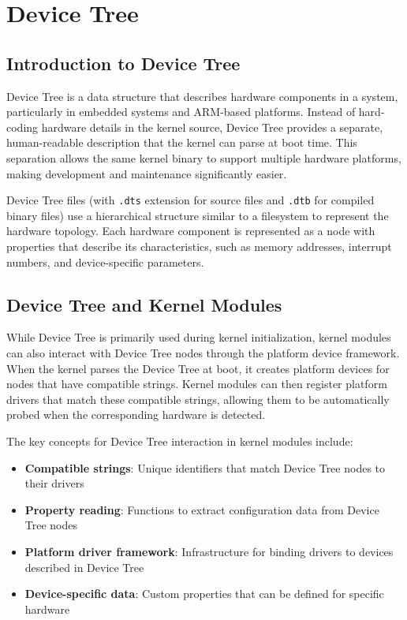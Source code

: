 \documentclass[10pt, oneside]{book}
\begin{document}

\section{Device Tree}
\label{sec:device_tree}
\subsection{Introduction to Device Tree}
\label{sec:dt_intro}
Device Tree is a data structure that describes hardware components in a system, particularly in embedded systems and ARM-based platforms.
Instead of hard-coding hardware details in the kernel source, Device Tree provides a separate, human-readable description that the kernel can parse at boot time.
This separation allows the same kernel binary to support multiple hardware platforms,
making development and maintenance significantly easier.

Device Tree files (with \verb|.dts| extension for source files and \verb|.dtb| for compiled binary files) use a hierarchical structure similar to a filesystem to represent the hardware topology.
Each hardware component is represented as a node with properties that describe its characteristics,
such as memory addresses, interrupt numbers, and device-specific parameters.

\subsection{Device Tree and Kernel Modules}
\label{sec:dt_modules}
While Device Tree is primarily used during kernel initialization, kernel modules can also interact with Device Tree nodes through the platform device framework.
When the kernel parses the Device Tree at boot, it creates platform devices for nodes that have compatible strings.
Kernel modules can then register platform drivers that match these compatible strings, allowing them to be automatically probed when the corresponding hardware is detected.

The key concepts for Device Tree interaction in kernel modules include:
\begin{itemize}
  \item \textbf{Compatible strings}: Unique identifiers that match Device Tree nodes to their drivers
  \item \textbf{Property reading}: Functions to extract configuration data from Device Tree nodes
  \item \textbf{Platform driver framework}: Infrastructure for binding drivers to devices described in Device Tree
  \item \textbf{Device-specific data}: Custom properties that can be defined for specific hardware
\end{itemize}
\end{document}
